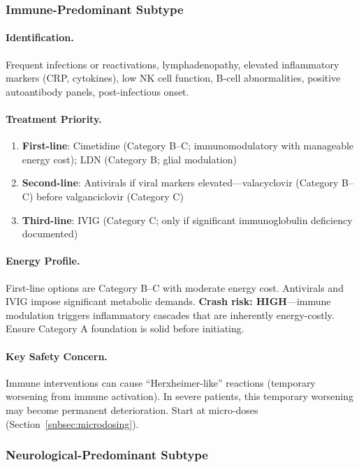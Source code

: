\subsubsection{Immune-Predominant Subtype}

\paragraph{Identification.} Frequent infections or reactivations, lymphadenopathy, elevated inflammatory markers (CRP, cytokines), low NK cell function, B-cell abnormalities, positive autoantibody panels, post-infectious onset.

\paragraph{Treatment Priority.}
\begin{enumerate}
    \item \textbf{First-line}: Cimetidine (Category B--C; immunomodulatory with manageable energy cost); LDN (Category B; glial modulation)
    \item \textbf{Second-line}: Antivirals if viral markers elevated---valacyclovir (Category B--C) before valganciclovir (Category C)
    \item \textbf{Third-line}: IVIG (Category C; only if significant immunoglobulin deficiency documented)
\end{enumerate}

\paragraph{Energy Profile.} First-line options are Category B--C with moderate energy cost. Antivirals and IVIG impose significant metabolic demands. \textbf{Crash risk: HIGH}---immune modulation triggers inflammatory cascades that are inherently energy-costly. Ensure Category A foundation is solid before initiating.

\paragraph{Key Safety Concern.} Immune interventions can cause ``Herxheimer-like'' reactions (temporary worsening from immune activation). In severe patients, this temporary worsening may become permanent deterioration. Start at micro-doses (Section~\ref{subsec:microdosing}).

\subsubsection{Neurological-Predominant Subtype}

